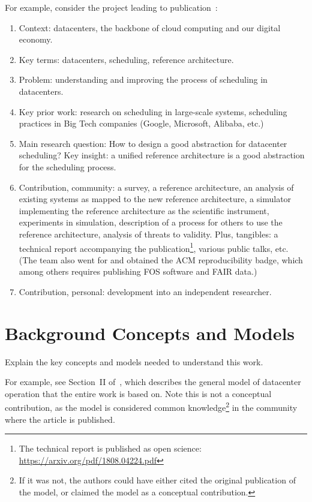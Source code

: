\documentclass[11pt]{article}
\begin{document}
For example, consider the project leading to publication~\cite{DBLP:conf/sc/AndreadisVMI18}:
\begin{enumerate}
    \item Context: datacenters, the backbone of cloud computing and our digital economy.
    \item Key terms: datacenters, scheduling, reference architecture.
    \item Problem: understanding and improving the process of scheduling in datacenters.
    \item Key prior work: research on scheduling in large-scale systems, scheduling practices in Big Tech companies (Google, Microsoft, Alibaba, etc.)
    \item Main research question: How to design a good abstraction for datacenter scheduling? Key insight: a unified reference architecture is a good  abstraction for the scheduling process.
    \item Contribution, community: a survey, a reference architecture, an analysis of existing systems as mapped to the new reference architecture, a simulator implementing the reference architecture as the scientific instrument, experiments in simulation, description of a process for others to use the reference architecture, analysis of threats to validity. 
    Plus, tangibles: a technical report accompanying the publication\footnote{The technical report is published as open science: \url{https://arxiv.org/pdf/1808.04224.pdf}}, various public talks, etc. (The team also went for and obtained the ACM reproducibility badge, which among others requires publishing FOS software and FAIR data.)
    \item Contribution, personal: development into an independent researcher.
\end{enumerate}




\section{Background Concepts and Models} \label{sec:background}

Explain the key concepts and models needed to understand this work.


For example, see Section~II of~\cite{DBLP:conf/sc/AndreadisVMI18}, which describes the general model of datacenter operation that the entire work is based on. Note this is not a conceptual contribution, as the model is considered common knowledge\footnote{If it was not, the authors could have either cited the original publication of the model, or claimed the model as a conceptual contribution.} in the community where the article is published. 
\end{document}
